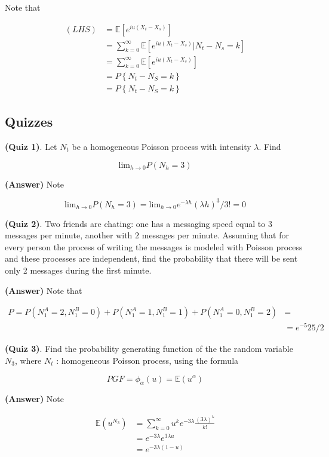 \documentclass[12pt]{article}
\theoremstyle{nonumberbreak}
\begin{document}
Note that 

$$
\begin{aligned}
(LHS) &= \mathbb{E} \left[ e^{iu (X_t - X_s)} \right] \\[8pt]
&= \sum_{k=0}^\infty \mathbb{E} \left[ e^{iu(X_t - X_s)} \vert N_t - N_s = k \right] \\[8pt]
&= \sum_{k=0}^\infty \mathbb{E} \left[ e^{iu(X_t - X_s)}\right] \\[8pt]
&= P\left\{ N_t - N_S = k \right\} \\[8pt]
&= P\left\{ N_t - N_S = k \right\} 
\end{aligned}
$$



\subsection{Quizzes}

\textbf{(Quiz 1)}. Let $N_t$ be a homogeneous Poisson process with intensity $\lambda$. Find

$$
\mathrm{lim}_{h\to0} P(N_h = 3)
$$

\textbf{(Answer)} Note

$$
\mathrm{lim}_{h\to0} P(N_h = 3) = \mathrm{lim}_{h\to0} e^{-\lambda h} (\lambda h)^3/3! = 0
$$


\textbf{(Quiz 2)}. Two friends are chating: one has a messaging speed equal to $3$ messages per minute, another with $2$ messages per minute. Assuming that for every person the process of writing the messages is modeled with Poisson process and these processes are independent, find the probability that there will be sent only 2 messages during the first minute.

\textbf{(Answer)} Note that

$$
\begin{aligned}
P = P(N_1^A = 2, N_1^B = 0) + P(N_1^A = 1, N_1^B = 1) + P(N_1^A = 0, N_1^B = 2) &= \\[8pt]
&= e^{-5} 25/2
\end{aligned}
$$



\textbf{(Quiz 3)}. Find the probability generating function of the the random variable $N_3$, where $N_t$ : homogeneous Poisson process, using the formula 

$$
PGF = \phi_\alpha (u) = \mathbb{E}(u^\alpha)
$$

\textbf{(Answer)} Note

$$
\begin{aligned}
\mathbb{E}(u^{N_3}) &= \sum_{k=0}^\infty u^k e^{-3\lambda} \frac{(3\lambda)^k}{k!} \\[8pt]
&= e^{-3\lambda} e^{3\lambda u} \\[8pt]
&= e^{-3\lambda(1-u)}
\end{aligned}
$$
\end{document}
